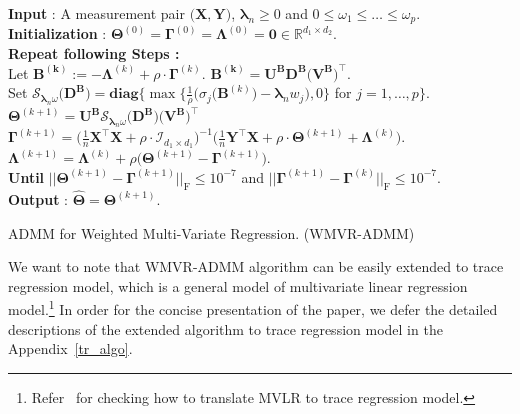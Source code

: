 \documentclass[alpha-refs]{wiley-article}
\begin{document}
\begin{algorithm}[t] 
    \textbf{Input} : A measurement pair $\big( \boldsymbol{X}, \boldsymbol{Y} \big)$, $\boldsymbol{\lambda}_{n} \geq 0$ and $0\leq \omega_{1} \leq \dots \leq \omega_{p}$. \\
    \textbf{Initialization} : $\boldsymbol{\Theta}^{(0)}=\boldsymbol{\Gamma}^{(0)}=\boldsymbol{\Lambda}^{(0)}=\boldsymbol{0} \in\mathbb{R}^{d_{1}\times d_{2}}$. \\
    {\bf Repeat following Steps :} \\
     Let $\boldsymbol{B^{(k)}}:=-\boldsymbol{\Lambda}^{(k)}+\rho \cdot \boldsymbol{\Gamma}^{(k)}$.
    \quad $\boldsymbol{B^{(k)}}=\boldsymbol{U}^{\textbf{B}}\boldsymbol{D}^{\textbf{B}}\big(\boldsymbol{V}^{\textbf{B}}\big)^{\top}$. \\
    \qquad \qquad \qquad Set $\mathcal{S}_{\boldsymbol{\lambda}_{n}\omega}\big(\boldsymbol{D}^{\textbf{B}}\big)=\textbf{diag}\bigg\{ \max\bigg\{\frac{1}{\rho}\big(\sigma_{j}(\boldsymbol{B}^{(k)}\big)-\boldsymbol{\lambda}_{n} w_{j}\big),0 \bigg\}$ for $j=1,\dots,p \bigg\}$.  \\
    \qquad \qquad \qquad $\boldsymbol{\Theta}^{(k+1)} = \boldsymbol{U}^{\textbf{B}}\mathcal{S}_{\boldsymbol{\lambda}_{n}\omega}\big(\boldsymbol{D}^{\textbf{B}}\big)\big(\boldsymbol{V}^{\textbf{B}}\big)^{\top}$ \\
    $\boldsymbol{\Gamma}^{(k+1)} = \big( \frac{1}{n}\boldsymbol{X}^{\top}\boldsymbol{X}+\rho\cdot\mathcal{I}_{d_{1} \times d_{1}} \big)^{-1}\big( \frac{1}{n}\boldsymbol{Y}^{\top}\boldsymbol{X} + \rho \cdot \boldsymbol{\Theta}^{(k+1)} + \boldsymbol{\Lambda}^{(k)} \big).$\\
     $\boldsymbol{\Lambda}^{(k+1)} = \boldsymbol{\Lambda}^{(k)} + \rho\big( \boldsymbol{\Theta}^{(k+1)}-\boldsymbol{\Gamma}^{(k+1)} \big)$.\\
    {\bf Until} $|| \boldsymbol{\Theta}^{(k+1)}-\boldsymbol{\Gamma}^{(k+1)} ||_{\text{F}}\leq 10^{-7}$ and $|| \boldsymbol{\Gamma}^{(k+1)}-\boldsymbol{\Gamma}^{(k)} ||_{\text{F}}\leq 10^{-7}$. \\
    \textbf{Output} : $\widehat{\boldsymbol{\Theta}}=\boldsymbol{\Theta}^{(k+1)}$. 
    \caption{ADMM for Weighted Multi-Variate Regression. (WMVR-ADMM)}
    \label{alg:1}
\end{algorithm}

\begin{remark}
We want to note that WMVR-ADMM algorithm can be easily extended to trace regression model, which is a general model of multivariate linear regression model.\footnote{Refer~\citet{negahban2011estimation} for checking how to translate MVLR to trace regression model.}
In order for the concise presentation of the paper, we defer the detailed descriptions of the extended algorithm to trace regression model in the Appendix~\ref{tr_algo}.
\end{remark}
\end{document}
